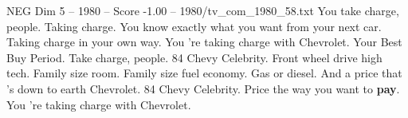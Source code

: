 \begin{textsample}{NEG Dim 5 – 1980 – Score -1.00 – 1980/tv\_com\_1980\_58.txt}  \label{ex:f5_neg_089}
You take charge, people.
Taking charge.
You know exactly what you want from your next car.
Taking charge in your own way.
You 're taking charge with Chevrolet.
Your Best Buy Period.
Take charge, people. 84 Chevy Celebrity.
Front wheel drive high tech.
Family size room.
Family size fuel economy.
Gas or diesel.
And a price that 's down to earth Chevrolet. 84 Chevy Celebrity.
Price the way you want to \textbf{pay}.
You 're taking charge with Chevrolet.

\end{textsample}
